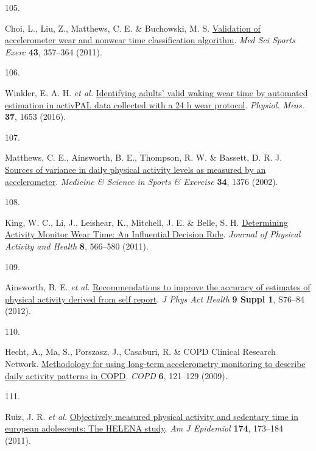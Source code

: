 \documentclass[
  10pt,
]{scrbook}
\newlength{\cslhangindent}
\newlength{\csllabelwidth}
\newlength{\cslentryspacingunit} %
\newenvironment{CSLReferences}[2] %
 {%
  \setlength{\parindent}{0pt}
  \ifodd #1
  \let\oldpar\par
  \def\par{\hangindent=\cslhangindent\oldpar}
  \fi
  \setlength{\parskip}{#2\cslentryspacingunit}
 }%
 {}
\newcommand{\CSLLeftMargin}[1]{\parbox[t]{\csllabelwidth}{#1}}
\newcommand{\CSLRightInline}[1]{\parbox[t]{\linewidth - \csllabelwidth}{#1}\break}
\let\originaltextbf\textbf
\renewcommand{\textbf}[1]{\textcolor{color1}{\textsf{\originaltextbf{#1}}}}
\begin{document}
\begin{CSLReferences}{0}{0}
\leavevmode{}%
\CSLLeftMargin{105. }%
\CSLRightInline{Choi, L., Liu, Z., Matthews, C. E. \& Buchowski, M. S.
\href{https://doi.org/10.1249/MSS.0b013e3181ed61a3}{Validation of
accelerometer wear and nonwear time classification algorithm}. \emph{Med
Sci Sports Exerc} \textbf{43}, 357--364 (2011).}

\leavevmode{}%
\CSLLeftMargin{106. }%
\CSLRightInline{Winkler, E. A. H. \emph{et al.}
\href{https://doi.org/10.1088/0967-3334/37/10/1653}{Identifying adults'
valid waking wear time by automated estimation in {activPAL} data
collected with a 24 h wear protocol}. \emph{Physiol. Meas.} \textbf{37},
1653 (2016).}

\leavevmode{}%
\CSLLeftMargin{107. }%
\CSLRightInline{Matthews, C. E., Ainsworth, B. E., Thompson, R. W. \&
Bassett, D. R. J.
\href{https://journals.lww.com/acsm-msse/fulltext/2002/08000/sources_of_variance_in_daily_physical_activity.21.aspx}{Sources
of variance in daily physical activity levels as measured by an
accelerometer}. \emph{Medicine \& Science in Sports \& Exercise}
\textbf{34}, 1376 (2002).}

\leavevmode{}%
\CSLLeftMargin{108. }%
\CSLRightInline{King, W. C., Li, J., Leishear, K., Mitchell, J. E. \&
Belle, S. H. \href{https://doi.org/10.1123/jpah.8.4.566}{Determining
Activity Monitor Wear Time: An Influential Decision Rule}. \emph{Journal
of Physical Activity and Health} \textbf{8}, 566--580 (2011).}

\leavevmode{}%
\CSLLeftMargin{109. }%
\CSLRightInline{Ainsworth, B. E. \emph{et al.}
\href{https://doi.org/10.1123/jpah.9.s1.s76}{Recommendations to improve
the accuracy of estimates of physical activity derived from self
report}. \emph{J Phys Act Health} \textbf{9 Suppl 1}, S76--84 (2012).}

\leavevmode{}%
\CSLLeftMargin{110. }%
\CSLRightInline{Hecht, A., Ma, S., Porszasz, J., Casaburi, R. \& COPD
Clinical Research Network.
\href{https://doi.org/10.1080/15412550902755044}{Methodology for using
long-term accelerometry monitoring to describe daily activity patterns
in {COPD}}. \emph{{COPD}} \textbf{6}, 121--129 (2009).}

\leavevmode{}%
\CSLLeftMargin{111. }%
\CSLRightInline{Ruiz, J. R. \emph{et al.}
\href{https://doi.org/10.1093/aje/kwr068}{Objectively measured physical
activity and sedentary time in european adolescents: The {HELENA}
study}. \emph{Am J Epidemiol} \textbf{174}, 173--184 (2011).}


\end{CSLReferences}
\end{document}
